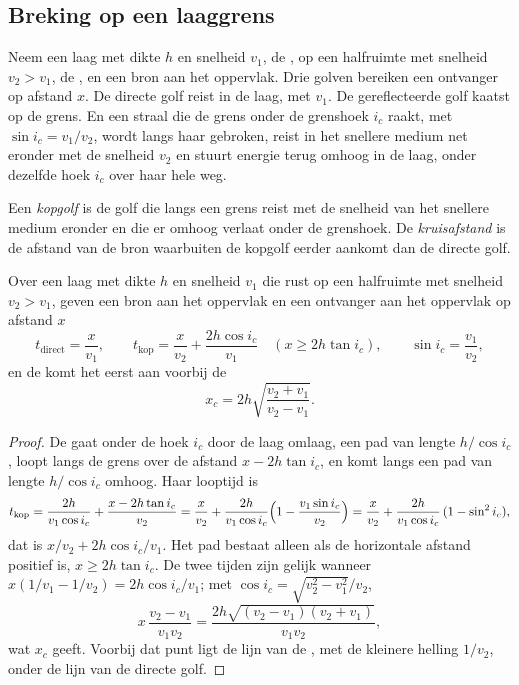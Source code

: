 \subsection{Breking op een laaggrens}

Neem een laag met dikte $h$ en snelheid $v_1$, de , op een halfruimte met snelheid $v_2 > v_1$, de , en een bron aan het
oppervlak. Drie golven bereiken een ontvanger op afstand $x$. De directe golf reist in de laag, met $v_1$. De gereflecteerde golf
kaatst op de grens. En een straal die de grens onder de grenshoek $i_c$ raakt, met $\sin i_c = v_1/v_2$, wordt langs haar gebroken, reist
in het snellere medium net eronder met de snelheid $v_2$ en stuurt energie terug omhoog in de laag, onder dezelfde hoek $i_c$ over haar
hele weg.

\begin{definition}\label{def:b1:layered-earth:head-wave}
Een \emph{kopgolf} is de golf die langs een grens reist met de snelheid van het snellere medium eronder en die er
omhoog verlaat onder de grenshoek. De \emph{kruisafstand} is de afstand van de bron waarbuiten de kopgolf eerder aankomt
dan de directe golf.
\end{definition}

\begin{theorem}\label{thm:b1:layered-earth:two-layer}
Over een laag met dikte $h$ en snelheid $v_1$ die rust op een halfruimte met snelheid $v_2 > v_1$, geven een bron aan het oppervlak en een
ontvanger aan het oppervlak op afstand $x$
\[
  t_{\text{direct}} = \frac{x}{v_1}, \qquad
  t_{\text{kop}} = \frac{x}{v_2} + \frac{2h\cos i_c}{v_1}
  \quad (x \ge 2h\tan i_c), \qquad \sin i_c = \frac{v_1}{v_2},
\]
en de  komt het eerst aan voorbij de 
\[
  x_c = 2h\sqrt{\frac{v_2 + v_1}{v_2 - v_1}}.
\]
\end{theorem}

\begin{proof}
De  gaat onder de hoek $i_c$ door de laag omlaag, een pad van lengte $h/\cos i_c$, loopt langs de grens over de afstand
$x - 2h\tan i_c$, en komt langs een pad van lengte $h/\cos i_c$ omhoog. Haar looptijd is
\[
  t_{\text{kop}} = \frac{2h}{v_1\cos i_c} + \frac{x - 2h\tan i_c}{v_2}
  = \frac{x}{v_2} + \frac{2h}{v_1\cos i_c}\Bigl(1 - \frac{v_1\sin i_c}{v_2}\Bigr)
  = \frac{x}{v_2} + \frac{2h}{v_1\cos i_c}\,(1 - \sin^2 i_c),
\]
dat is $x/v_2 + 2h\cos i_c/v_1$. Het pad bestaat alleen als de horizontale afstand positief is, $x \ge 2h\tan i_c$. De twee tijden zijn
gelijk wanneer $x(1/v_1 - 1/v_2) = 2h\cos i_c/v_1$; met $\cos i_c = \sqrt{v_2^2 - v_1^2}/v_2$,
\[
  x\,\frac{v_2 - v_1}{v_1 v_2} = \frac{2h\sqrt{(v_2 - v_1)(v_2 + v_1)}}{v_1 v_2},
\]
wat $x_c$ geeft. Voorbij dat punt ligt de lijn van de , met de kleinere helling $1/v_2$, onder de lijn van de directe golf.
\end{proof}

